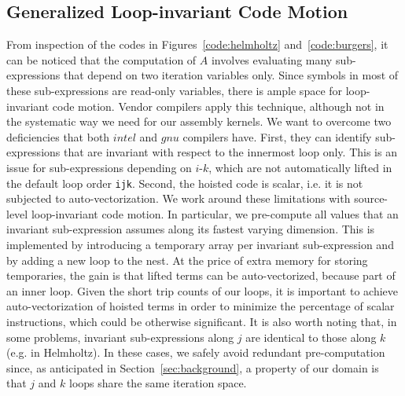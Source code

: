 \documentclass[conference]{IEEEtran}
\begin{document}
\subsection{Generalized Loop-invariant Code Motion}
\label{sec:code-transf-licm}
From inspection of the codes in Figures~\ref{code:helmholtz} and~\ref{code:burgers}, it can be noticed that the computation of $A$ involves evaluating many sub-expressions that depend on two iteration variables only. Since symbols in most of these sub-expressions are read-only variables, there is ample space for loop-invariant code motion. Vendor compilers apply this technique, although not in the systematic way we need for our assembly kernels. We want to overcome two deficiencies that both $intel$ and $gnu$ compilers have. First, they can identify sub-expressions that are invariant with respect to the innermost loop only. This is an issue for sub-expressions depending on $i$-$k$, which are not automatically lifted in the default loop order \texttt{ijk}. Second, the hoisted code is scalar, i.e. it is not subjected to auto-vectorization. We work around these limitations with source-level loop-invariant code motion. In particular, we pre-compute all values that an invariant sub-expression assumes along its fastest varying dimension. This is implemented by introducing a temporary array per invariant sub-expression and by adding a new loop to the nest. At the price of extra memory for storing temporaries, the gain is that lifted terms can be auto-vectorized, because part of an inner loop. Given the short trip counts of our loops, it is important to achieve auto-vectorization of hoisted terms in order to minimize the percentage of scalar instructions, which could be otherwise significant. It is also worth noting that, in some problems, invariant sub-expressions along $j$ are identical to those along $k$ (e.g. in Helmholtz). In these cases, we safely avoid redundant pre-computation since, as anticipated in Section~\ref{sec:background}, a property of our domain is that $j$ and $k$ loops share the same iteration space.
\end{document}
